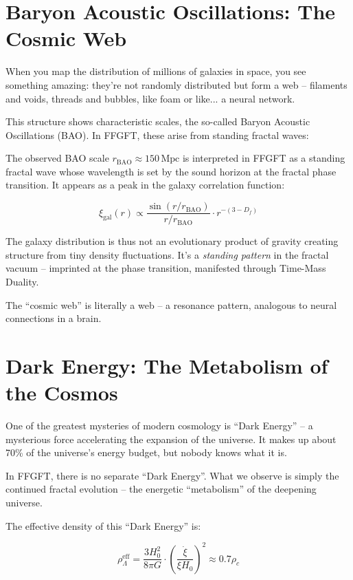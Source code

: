 \section{Baryon Acoustic Oscillations: The Cosmic Web}

When you map the distribution of millions of galaxies in space, you see something amazing: they're not randomly distributed but form a web -- filaments and voids, threads and bubbles, like foam or like... a neural network.

This structure shows characteristic scales, the so-called Baryon Acoustic Oscillations (BAO). In FFGFT, these arise from standing fractal waves:

The observed BAO scale \(r_{\text{BAO}} \approx 150\,\text{Mpc}\) is interpreted in FFGFT as a standing fractal wave whose wavelength is set by the sound horizon at the fractal phase transition. It appears as a peak in the galaxy correlation function:

\begin{equation}
\xi_{\text{gal}}(r) \propto \frac{\sin(r/r_{\text{BAO}})}{r/r_{\text{BAO}}} \cdot r^{-(3-D_f)}
\end{equation}

The galaxy distribution is thus not an evolutionary product of gravity creating structure from tiny density fluctuations. It's a \textit{standing pattern} in the fractal vacuum -- imprinted at the phase transition, manifested through Time-Mass Duality.

The ``cosmic web'' is literally a web -- a resonance pattern, analogous to neural connections in a brain.

\section{Dark Energy: The Metabolism of the Cosmos}

One of the greatest mysteries of modern cosmology is ``Dark Energy'' -- a mysterious force accelerating the expansion of the universe. It makes up about 70\% of the universe's energy budget, but nobody knows what it is.

In FFGFT, there is no separate ``Dark Energy''. What we observe is simply the continued fractal evolution -- the energetic ``metabolism'' of the deepening universe.

The effective density of this ``Dark Energy'' is:

\begin{equation}
\rho_{\Lambda}^{\text{eff}} = \frac{3H_0^2}{8\pi G} \cdot \left(\frac{\dot{\xi}}{\xi H_0}\right)^2 \approx 0.7 \rho_c
\end{equation}

